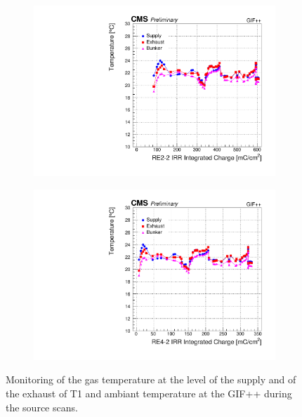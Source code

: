 	\begin{figure}[H]
    	\begin{subfigure}{0.5\linewidth}
    		\centering
			\includegraphics[width = \linewidth]{fig/chapt5/RE2-2-Temperature-monitoring.pdf}
        	\caption{\label{fig:GIFpp-Temperature:A}}
    	\end{subfigure}
    	\begin{subfigure}{0.5\linewidth}
			\centering
    		\includegraphics[width = \linewidth]{fig/chapt5/RE4-2-Temperature-monitoring.pdf}
        	\caption{\label{fig:GIFpp-Temperature:B}}
    	\end{subfigure}
		\caption{\label{fig:GIFpp-Temperature} Monitoring of the gas temperature at the level of the supply and of the exhaust of T1 and ambiant temperature at the GIF++ during the source scans.}
	\end{figure}
	
